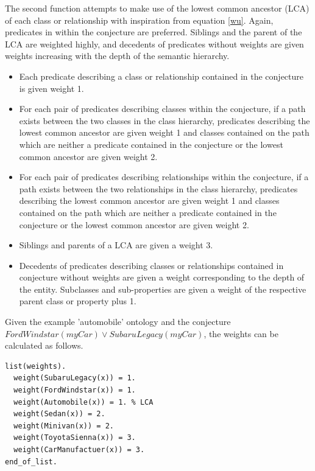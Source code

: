 \documentclass{article}
\begin{document}
The second function attempts to make use of the lowest common ancestor (LCA) of each class or relationship with inspiration from equation \ref{wu}. Again, predicates in within the conjecture are preferred. Siblings and the parent of the LCA are weighted highly, and decedents of predicates without weights are given weights increasing with the depth of the semantic hierarchy. 

\begin{singlespace}
\begin{itemize}
	\item Each predicate describing a class or relationship contained in the conjecture is given weight 1. 
	\item For each pair of predicates describing classes within the conjecture, if a path exists between the two classes in the class hierarchy, predicates describing the lowest common ancestor are given weight 1 and classes contained on the path which are neither a predicate contained in the conjecture or the lowest common ancestor are given weight 2. 
	\item For each pair of predicates describing relationships within the conjecture, if a path exists between the two relationships in the class hierarchy, predicates describing the lowest common ancestor are given weight 1 and classes contained on the path which are neither a predicate contained in the conjecture or the lowest common ancestor are given weight 2. 
	\item Siblings and parents of a LCA are given a weight 3. 
	\item Decedents of predicates describing classes or relationships contained in conjecture without weights are given a weight corresponding to the depth of the entity. Subclasses and sub-properties are given a weight of the respective parent class or property plus 1. 
\end{itemize}
\end{singlespace}

Given the example 'automobile' ontology and the conjecture $FordWindstar(myCar) \lor SubaruLegacy(myCar)$,   the weights can be calculated as follows. 

\begin{singlespace}
\begin{verbatim}
list(weights).
  weight(SubaruLegacy(x)) = 1. 
  weight(FordWindstar(x)) = 1. 
  weight(Automobile(x)) = 1. % LCA
  weight(Sedan(x)) = 2. 
  weight(Minivan(x)) = 2. 
  weight(ToyotaSienna(x)) = 3. 
  weight(CarManufactuer(x)) = 3. 
end_of_list.
\end{verbatim}
\end{singlespace}
\end{document}
